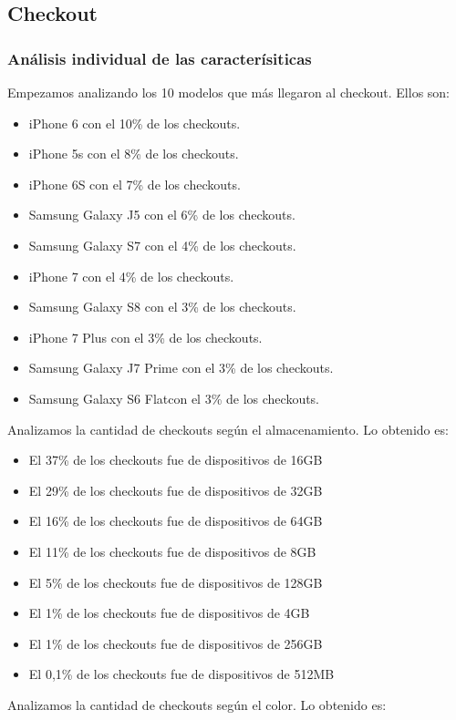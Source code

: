 \documentclass[titlepage,a4paper]{article}
\begin{document}
	\subsection{Checkout}
	\subsubsection{Análisis individual de las caracterísiticas}
	Empezamos analizando los 10 modelos que más llegaron al checkout. Ellos son:
	\begin{itemize}
	\item iPhone 6 con el 10\% de los checkouts.
	\item iPhone 5s con el 8\% de los checkouts.
	\item iPhone 6S  con el 7\% de los checkouts.
	\item Samsung Galaxy J5 con el 6\% de los checkouts.
	\item Samsung Galaxy S7 con el 4\% de los checkouts.
	\item iPhone 7 con el 4\% de los checkouts.
	\item Samsung Galaxy S8 con el 3\% de los checkouts.
	\item iPhone 7 Plus con el 3\% de los checkouts.
	\item Samsung Galaxy J7 Prime con el 3\% de los checkouts.
	\item Samsung Galaxy S6 Flatcon el 3\% de los checkouts.
	\end{itemize}
	Analizamos la cantidad de checkouts según el almacenamiento. Lo obtenido es:
	\begin{itemize}
	\item El 37\% de los checkouts fue de dispositivos de 16GB
	\item El 29\% de los checkouts fue de dispositivos de 32GB
	\item	El 16\% de los checkouts fue de dispositivos de 64GB
	\item	El 11\% de los checkouts fue de dispositivos de 8GB
	\item	El 5\% de los checkouts fue de dispositivos de 128GB
	\item	El 1\% de los checkouts fue de dispositivos de 4GB
	\item	El 1\% de los checkouts fue de dispositivos de 256GB
	\item	El 0,1\% de los checkouts fue de dispositivos de 512MB
	\end{itemize}
	Analizamos la cantidad de checkouts según el color. Lo obtenido es:
\end{document}
